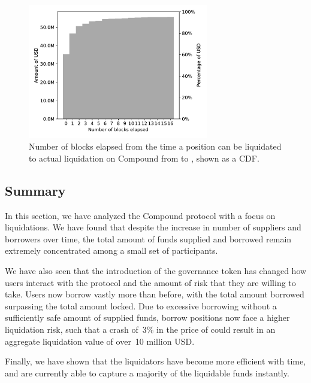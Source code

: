 \begin{figure}[tbp]
    \centering
    \includegraphics[width=0.7\textwidth]{./6-application-security/figures/time-to-liquidation.pdf}
    \caption{Number of blocks elapsed from the time a position can be liquidated to actual liquidation on Compound from \StartDate to \EndDate, shown as a CDF.}
    \label{fig:blocks-spent}
\end{figure}

\subsection{Summary}
In this section, we have analyzed the Compound protocol with a focus on liquidations.
We have found that despite the increase in number of suppliers and borrowers over time, the total amount of funds supplied and borrowed remain extremely concentrated among a small set of participants.

We have also seen that the introduction of the  governance token has changed how users interact with the protocol and the amount of risk that they are willing to take.
Users now borrow vastly more than before, with the total amount borrowed surpassing the total amount locked.
Due to excessive borrowing without a sufficiently safe amount of supplied funds, borrow positions now face a higher liquidation risk, such that a crash of~3\% in the price of  could result in an aggregate liquidation value of over~10 million USD.

Finally, we have shown that the liquidators have become more efficient with time, and are currently able to capture a majority of the liquidable funds instantly.
